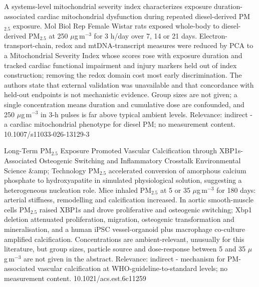 \documentclass[10pt]{article}
\begin{document}
{A systems-level mitochondrial severity index characterizes exposure duration-associated cardiac mitochondrial dysfunction during repeated diesel-derived PM$_{2.5}$ exposure.}
{Mol Biol Rep}
{Female Wistar rats exposed whole-body to diesel-derived PM$_{2.5}$ at 250 $\mu$g\,m$^{-3}$ for 3 h/day over 7, 14 or 21 days. Electron-transport-chain, redox and mtDNA-transcript measures were reduced by PCA to a Mitochondrial Severity Index whose scores rose with exposure duration and tracked cardiac functional impairment and injury markers held out of index construction; removing the redox domain cost most early discrimination. The authors state that external validation was unavailable and that concordance with held-out endpoints is not mechanistic evidence. Group sizes are not given; a single concentration means duration and cumulative dose are confounded, and 250 $\mu$g\,m$^{-3}$ in 3-h pulses is far above typical ambient levels. Relevance: indirect - a cardiac mitochondrial phenotype for diesel PM; no measurement content.}
{10.1007/s11033-026-13129-3}

{Long-Term PM$_{2.5}$ Exposure Promoted Vascular Calcification through XBP1s-Associated Osteogenic Switching and Inflammatory Crosstalk}
{Environmental Science \&amp; Technology}
{PM$_{2.5}$ accelerated conversion of amorphous calcium phosphate to hydroxyapatite in simulated physiological solution, suggesting a heterogeneous nucleation role. Mice inhaled PM$_{2.5}$ at 5 or 35 $\mu$g\,m$^{-3}$ for 180 days: arterial stiffness, remodelling and calcification increased. In aortic smooth-muscle cells PM$_{2.5}$ raised XBP1s and drove proliferative and osteogenic switching; Xbp1 deletion attenuated proliferation, migration, osteogenic transformation and mineralisation, and a human iPSC vessel-organoid plus macrophage co-culture amplified calcification. Concentrations are ambient-relevant, unusually for this literature, but group sizes, particle source and dose-response between 5 and 35 $\mu$g\,m$^{-3}$ are not given in the abstract. Relevance: indirect - mechanism for PM-associated vascular calcification at WHO-guideline-to-standard levels; no measurement content.}
{10.1021/acs.est.6c11259}

\par{}\baselineskip{}\baselineskip
{}
\end{document}
